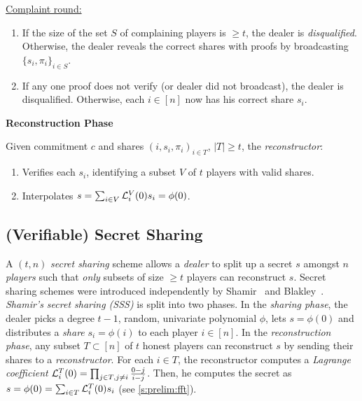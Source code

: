 {\begin{algorithm}[t]
    \underline{Complaint round:}
    \begin{enumerate}
        \item If the size of the set $S$ of complaining players is $\ge t$, the dealer is \textit{disqualified}.
              Otherwise, the dealer reveals the correct shares with proofs by broadcasting $\{s_i, \pi_i\}_{i\in S}$.
        \item If any one proof does not verify (or dealer did not broadcast), the dealer is disqualified. Otherwise, each $i\in [n]$ now has his correct share $s_i$.
    \end{enumerate}
    
    \begin{center}
        \textbf{Reconstruction Phase}
    \end{center}
    \vspace{-.5em}
    Given commitment $c$ and shares $(i, s_i,\pi_i)_{i\in T}$, $|T|\ge t$, the \textit{reconstructor}:
    \begin{enumerate}
        \item Verifies each $s_i$, identifying a subset $V$ of $t$ players with valid shares.
        \item Interpolates $s=\sum_{i\in V} \mathcal{L}_i^V(0) s_i=\phi(0)$. 
    \end{enumerate}
\end{algorithm}
}

\evssAlgorithm

\subsection{(Verifiable) Secret Sharing}
\label{s:prelim:vss}
\label{s:prelim:shamir-secret-sharing}
A $(t,n)$ \textit{secret sharing} scheme allows a \textit{dealer} to split up a secret $s$ amongst $n$ \textit{players} such that \textit{only} subsets of size $\ge t$ players can reconstruct $s$.
Secret sharing schemes were introduced independently by Shamir~\cite{how-to-share-a-secret} and Blakley~\cite{Blakley1979}.
\textit{Shamir's secret sharing (SSS)} is split into two phases.
In the \textit{sharing phase}, the dealer picks a degree $t-1$, random, univariate polynomial $\phi$, lets $s=\phi(0)$ and distributes a \textit{share} $s_i = \phi(i)$ to each player $i\in [n]$.
In the \textit{reconstruction phase}, any subset $T\subset [n]$ of $t$ honest players can reconstruct $s$ by sending their shares to a \textit{reconstructor}.
For each $i\in T$, the reconstructor computes a \textit{Lagrange coefficient} $\mathcal{L}_i^T(0) = \prod_{j\in T, j\ne i} {\frac{0-j}{i - j}}$.
Then, he computes the secret as $s = \phi(0) = \sum_{i\in T} \mathcal{L}_i^T(0) s_i$ (see \cref{s:prelim:fft}).


